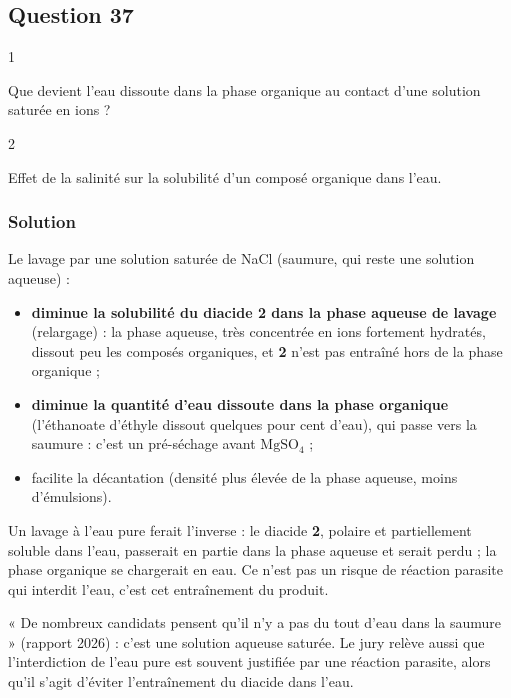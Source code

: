 \documentclass[11pt,a4paper]{article}
\providecommand{\tightlist}{\setlength{\itemsep}{0pt}\setlength{\parskip}{0pt}}
\begin{document}
\hypertarget{question-37}{%
\subsection{Question 37}\label{question-37}}

\begin{indication}{1}

Que devient l'eau dissoute dans la phase organique au contact d'une solution saturée en ions ?

\end{indication}

\begin{indication}{2}

Effet de la salinité sur la solubilité d'un composé organique dans l'eau.

\end{indication}

\hypertarget{solution-36}{%
\subsubsection{Solution}\label{solution-36}}

Le lavage par une solution saturée de NaCl (saumure, qui reste une solution aqueuse) :

\begin{itemize}
\tightlist
\item
  \textbf{diminue la solubilité du diacide 2 dans la phase aqueuse de lavage} (relargage) : la phase aqueuse, très concentrée en ions fortement hydratés, dissout peu les composés organiques, et \textbf{2} n'est pas entraîné hors de la phase organique ;
\item
  \textbf{diminue la quantité d'eau dissoute dans la phase organique} (l'éthanoate d'éthyle dissout quelques pour cent d'eau), qui passe vers la saumure : c'est un pré-séchage avant \(\mathrm{MgSO_4}\) ;
\item
  facilite la décantation (densité plus élevée de la phase aqueuse, moins d'émulsions).
\end{itemize}

Un lavage à l'eau pure ferait l'inverse : le diacide \textbf{2}, polaire et partiellement soluble dans l'eau, passerait en partie dans la phase aqueuse et serait perdu ; la phase organique se chargerait en eau. Ce n'est pas un risque de réaction parasite qui interdit l'eau, c'est cet entraînement du produit.

\begin{piege}

« De nombreux candidats pensent qu'il n'y a pas du tout d'eau dans la saumure » (rapport 2026) : c'est une solution aqueuse saturée. Le jury relève aussi que l'interdiction de l'eau pure est souvent justifiée par une réaction parasite, alors qu'il s'agit d'éviter l'entraînement du diacide dans l'eau.

\end{piege}
\end{document}
